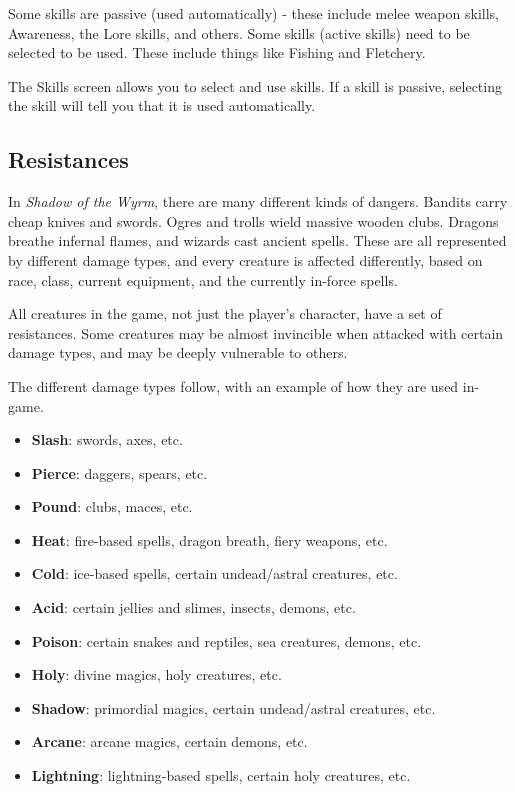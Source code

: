 Some skills are passive (used automatically) - these include melee weapon skills, Awareness, the Lore skills, and others. Some skills (active skills) need to be selected to be used. These include things like Fishing and Fletchery.

The Skills screen allows you to select and use skills. If a skill is passive, selecting the skill will tell you that it is used automatically.

\subsection{Resistances}

In {\it Shadow of the Wyrm}, there are many different kinds of dangers.  
Bandits carry cheap knives and swords.  Ogres and trolls wield massive
wooden clubs.  Dragons breathe infernal flames, and wizards cast ancient 
spells.  These are all represented by different damage types, and every 
creature is affected differently, based on race, class, current equipment, 
and the currently in-force spells.

All creatures in the game, not just the player's character, have a set of 
resistances.  Some creatures may be almost invincible when attacked with
certain damage types, and may be deeply vulnerable to others.

The different damage types follow, with an example of how they are used
in-game.

\begin{itemize}
\item {\bf Slash}: swords, axes, etc.
\item {\bf Pierce}: daggers, spears, etc.
\item {\bf Pound}: clubs, maces, etc.
\item {\bf Heat}: fire-based spells, dragon breath, fiery weapons, etc.
\item {\bf Cold}: ice-based spells, certain undead/astral creatures, etc.
\item {\bf Acid}: certain jellies and slimes, insects, demons, etc.
\item {\bf Poison}: certain snakes and reptiles, sea creatures, demons, etc.
\item {\bf Holy}: divine magics, holy creatures, etc.
\item {\bf Shadow}: primordial magics, certain undead/astral creatures, etc.
\item {\bf Arcane}: arcane magics, certain demons, etc.
\item {\bf Lightning}: lightning-based spells, certain holy creatures, etc.
\end{itemize}

